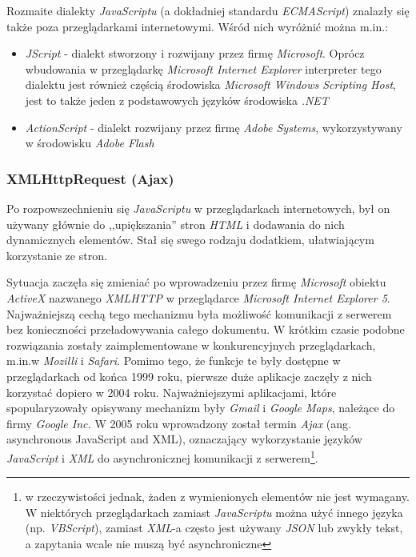 \documentclass[a4paper,12pt]{article}
\begin{document}
Rozmaite dialekty \emph{JavaScriptu} (a dokładniej standardu
\emph{ECMAScript}) znalazły się także poza przeglądarkami
internetowymi. Wśród nich wyróżnić można m.in.:

\begin{itemize}
\item \emph{JScript} - dialekt stworzony i rozwijany przez firmę
  \emph{Microsoft}. Oprócz wbudowania w przeglądarkę \emph{Microsoft
    Internet Explorer} interpreter tego dialektu jest również częścią
  środowiska \emph{Microsoft Windows Scripting Host}, jest to także
  jeden z podstawowych języków środowiska \emph{.NET}
\item \emph{ActionScript} - dialekt rozwijany przez firmę \emph{Adobe
    Systems}, wykorzystywany w środowisku \emph{Adobe Flash}
\end{itemize}

\subsubsection{XMLHttpRequest (Ajax)}
Po rozpowszechnieniu się \emph{JavaScriptu} w przeglądarkach
internetowych, był on używany głównie do ,,upiększania'' stron
\emph{HTML} i dodawania do nich dynamicznych elementów. Stał się swego
rodzaju dodatkiem, ułatwiającym korzystanie ze stron.

Sytuacja zaczęła się zmieniać po wprowadzeniu przez firmę
\emph{Microsoft} obiektu \emph{ActiveX} nazwanego \emph{XMLHTTP} w
przeglądarce \emph{Microsoft Internet Explorer 5}. Najważniejszą cechą
tego mechanizmu była możliwość komunikacji z serwerem bez konieczności
przeładowywania całego dokumentu. W krótkim czasie podobne rozwiązania
zostały zaimplementowane w konkurencyjnych przeglądarkach, m.in.w
\emph{Mozilli} i \emph{Safari}. Pomimo tego, że funkcje te były
dostępne w przeglądarkach od końca 1999 roku, pierwsze duże aplikacje
zaczęły z nich korzystać dopiero w 2004 roku. Najważniejszymi
aplikacjami, które spopularyzowały opisywany mechanizm były
\emph{Gmail} i \emph{Google Maps}, należące do firmy \emph{Google
  Inc.} W 2005 roku wprowadzony został termin \emph{Ajax}
(ang. asynchronous JavaScript and XML), oznaczający wykorzystanie
języków \emph{JavaScript} i \emph{XML} do asynchronicznej komunikacji
z serwerem\footnote{w rzeczywistości jednak, żaden z wymienionych
  elementów nie jest wymagany. W niektórych przeglądarkach zamiast
  \emph{JavaScriptu} można użyć innego języka (np. \emph{VBScript}),
  zamiast \emph{XML}-a często jest używany \emph{JSON} lub zwykły
  tekst, a zapytania wcale nie muszą być asynchroniczne\cite{ajax}}.
\end{document}
